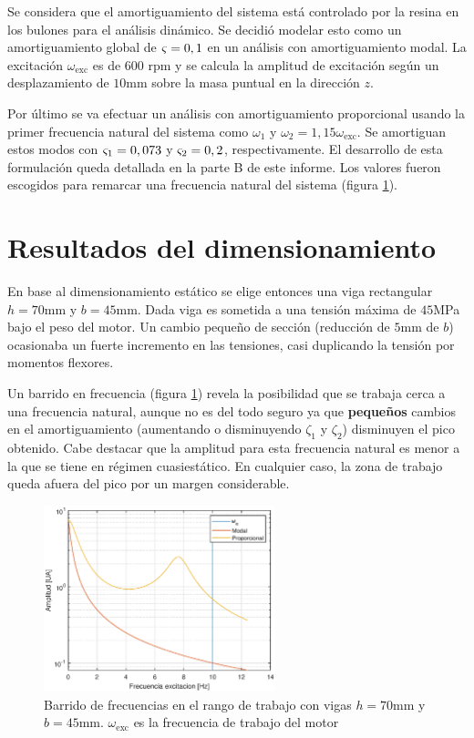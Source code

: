 \documentclass[onecolumn,10pt,titlepage,a4paper]{article}
\begin{document}
Se considera que el amortiguamiento del sistema está controlado por la resina en los bulones para el análisis dinámico. Se decidió modelar esto como un amortiguamiento global de $\varsigma = 0,1$ en un análisis con amortiguamiento modal. La excitación $\omega_{\mathrm{exc}}$ es de 600 rpm y se calcula la amplitud de excitación según un desplazamiento de $10$mm sobre la masa puntual en la dirección $z$.

Por último se va efectuar un análisis con amortiguamiento proporcional usando la primer frecuencia natural del sistema como $\omega_1$ y $\omega_2 = 1,15 \omega_{\mathrm{exc}}$. Se amortiguan estos modos con $\varsigma_{1}=0,073$ y $\varsigma_2=0,2$, respectivamente. El desarrollo de esta formulación queda detallada en la parte B de este informe. Los valores fueron escogidos para remarcar una frecuencia natural del sistema (figura \ref{fig:sinesweepA}).

\section{Resultados del dimensionamiento}
En base al dimensionamiento estático se elige entonces una viga rectangular $h=70\si{\milli \meter}$ y $b=45\si{\milli \meter}$. Dada viga es sometida a una tensión máxima de $45$MPa bajo el peso del motor. Un cambio pequeño de sección (reducción de $5$mm de $b$) ocasionaba un fuerte incremento en las tensiones, casi duplicando la tensión por momentos flexores.

Un barrido en frecuencia (figura \ref{fig:sinesweepA}) revela la posibilidad que se trabaja cerca a una frecuencia natural, aunque no es del todo seguro ya que \textbf{pequeños} cambios en el amortiguamiento (aumentando o disminuyendo $\zeta_1$ y $\zeta_2$) disminuyen el pico obtenido. Cabe destacar que la amplitud para esta frecuencia natural es menor a la que se tiene en régimen cuasiestático. En cualquier caso, la zona de trabajo queda afuera del pico por un margen considerable.




\begin{figure}[htb!]
	\centering
	\includegraphics[width=0.6\textwidth]{fig/sinesweepA.eps}
	\caption{Barrido de frecuencias en el rango de trabajo con vigas $h=70$mm y $b=45$mm. $\omega_{\mathrm{exc}}$ es la frecuencia de trabajo del motor}
	\label{fig:sinesweepA}
\end{figure}
\end{document}
